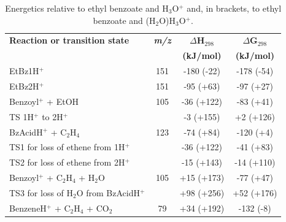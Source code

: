 \begin{table}[htbp]
\centering
\caption{Energetics relative to ethyl benzoate and H$_3$O$^+$ and, in brackets, to ethyl benzoate and (H$_2$O)H$_3$O$^+$. }
\label{tb:eb2}
\begin{tabular}{lccc}
\toprule
\textbf{Reaction or transition state}	&\textbf{\textit{m/z} } &\textbf{$\Delta$H$_{298}$} &\textbf{$\Delta$G$_{298}$}\\
& &	\textbf{(kJ/mol)} &\textbf{(kJ/mol)} \\  \toprule
EtBz1H$^+$   					&	151	& -180 (-22)  & -178 (-54)   \\ \midrule
EtBz2H$^+$   					&	151	& -95 (+63)  & -97 (+27)   \\ \midrule
Benzoyl$^+$  + EtOH				&	105	& -36 (+122)  & -83 (+41)   \\ \midrule
TS 1H$^+$ to 2H$^+$		&		& -3 (+155)  & +2 (+126)   \\ \midrule
BzAcidH$^+$ + C$_2$H$_4$	&	123	& -74 (+84)  & -120 (+4)   \\ \midrule
TS1 for loss of ethene from 1H$^+$	&		& -36 (+122)  & -41 (+83)   \\ \midrule
TS2 for loss of ethene from 2H$^+$	&		& -15 (+143)  & -14 (+110)   \\ \midrule
Benzoyl$^+$  + C$_2$H$_4$ + H$_2$O	&	105	& +15 (+173)  & -77 (+47)  \\ \midrule
TS3 for loss of H$_2$O from BzAcidH$^+$&	& +98 (+256)  & +52 (+176)   \\ \midrule
BenzeneH$^+$ + C$_2$H$_4$ + CO$_2$	 &	79	& +34 (+192)  & -132 (-8)  \\ 
\bottomrule
\end{tabular}
\end{table}


